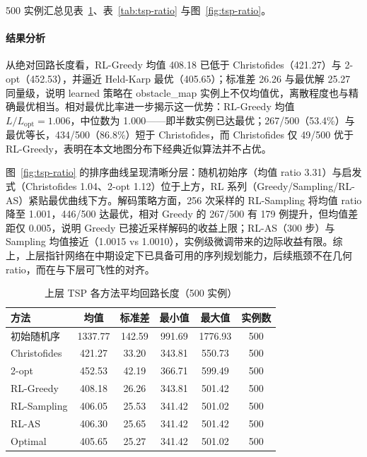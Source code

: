 500 实例汇总见表~\ref{tab:tsp-length}、表~\ref{tab:tsp-ratio} 与图~\ref{fig:tsp-ratio}。

\paragraph{结果分析}
从绝对回路长度看，RL-Greedy 均值 408.18 已低于 Christofides（421.27）与 2-opt（452.53），并逼近 Held-Karp 最优（405.65）；标准差 26.26 与最优解 25.27 同量级，说明 learned 策略在 obstacle\_map 实例上不仅均值优，离散程度也与精确最优相当。相对最优比率进一步揭示这一优势：RL-Greedy 均值 $L/L_{\mathrm{opt}}=1.006$，中位数为 1.000——即半数实例已达最优；267/500（53.4\%）与最优等长，434/500（86.8\%）短于 Christofides，而 Christofides 仅 49/500 优于 RL-Greedy，表明在本文地图分布下经典近似算法并不占优。

图~\ref{fig:tsp-ratio} 的排序曲线呈现清晰分层：随机初始序（均值 ratio 3.31）与启发式（Christofides 1.04、2-opt 1.12）位于上方，RL 系列（Greedy/Sampling/RL-AS）紧贴最优曲线下方。解码策略方面，256 次采样的 RL-Sampling 将均值 ratio 降至 1.001，446/500 达最优，相对 Greedy 的 267/500 有 179 例提升，但均值差距仅 0.005，说明 Greedy 已接近采样解码的收益上限；RL-AS（300 步）与 Sampling 均值接近（1.0015 vs 1.0010），实例级微调带来的边际收益有限。综上，上层指针网络在中期设定下已具备可用的序列规划能力，后续瓶颈不在几何 ratio，而在与下层可飞性的对齐。

\begin{table}[htbp]
  \centering
  \caption{上层 TSP 各方法平均回路长度（500 实例）}
  \label{tab:tsp-length}
  \begin{tabular}{lccccc}
    \toprule
    方法 & 均值 & 标准差 & 最小值 & 最大值 & 实例数 \\
    \midrule
    初始随机序   & 1337.77 & 142.59 & 991.69  & 1776.93 & 500 \\
    Christofides & 421.27  & 33.20  & 343.81  & 550.73  & 500 \\
    2-opt        & 452.53  & 42.19  & 366.71  & 599.49  & 500 \\
    RL-Greedy    & 408.18  & 26.26  & 343.81  & 501.42  & 500 \\
    RL-Sampling  & 406.05  & 25.53  & 341.42  & 501.02  & 500 \\
    RL-AS        & 406.30  & 25.65  & 341.42  & 501.42  & 500 \\
    Optimal      & 405.65  & 25.27  & 341.42  & 501.02  & 500 \\
    \bottomrule
  \end{tabular}
\end{table}

